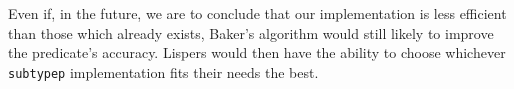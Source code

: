 \documentclass[format=sigconf]{acmart}
\newcommand\code[2][\small]{\sloppy\texttt{#1#2}}
\theoremstyle{definition}
\begin{document}
Even if, in the future, we are to conclude that our implementation is less
efficient than those which already exists, Baker's algorithm would still likely to
improve the predicate's accuracy. Lispers would then have the ability to
choose whichever \code{subtypep} implementation fits their needs the best.


\end{document}
